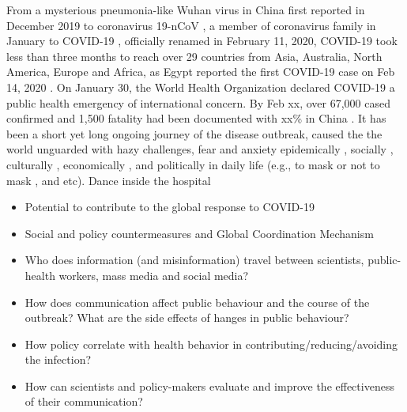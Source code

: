 
\proptitle{\fulltitle}


From a mysterious pneumonia-like Wuhan virus in China first reported in December 2019 to coronavirus 19-nCoV
, a member of coronavirus family \citep{} in January to COVID-19
, officially renamed in February 11, 2020,  COVID-19 took less than three months to reach over 29 countries from Asia, Australia, North America, Europe and Africa, as Egypt reported the first COVID-19 case on Feb 14, 2020 \citep{}.  
On January 30, the World Health Organization declared COVID-19 a public health emergency of international concern. By Feb xx, over 67,000 cased confirmed and  1,500 fatality had been documented with xx\% in China \citep{}.  
It has been a short yet long ongoing journey of the disease outbreak, caused the the world unguarded with hazy challenges, fear and anxiety epidemically \citep{}, socially \citep{} , culturally \citep{}, economically \citep{},  and politically \citep{} in daily life (e.g., to mask or not to mask 
, and etc).
Dance inside the hospital


\begin{itemize}
\item{Potential to contribute to the global response to COVID-19}
\item{Social and policy countermeasures and Global Coordination Mechanism}
\end{itemize}


\begin{itemize}
\item{Who does information (and misinformation) travel between scientists, public-health workers, mass media and social media?}
\item{How does communication affect public behaviour and the course of the outbreak? What are the side effects of hanges in public behaviour?}
\item{How policy correlate with health behavior in contributing/reducing/avoiding the infection?}
\item{How can scientists and policy-makers evaluate and improve the effectiveness of their communication?}
\end{itemize}

